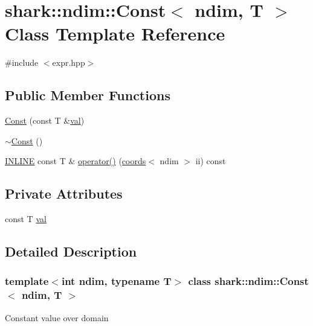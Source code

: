 \hypertarget{classshark_1_1ndim_1_1_const}{}\section{shark\+:\+:ndim\+:\+:Const$<$ ndim, T $>$ Class Template Reference}
\label{classshark_1_1ndim_1_1_const}


{\ttfamily \#include $<$expr.\+hpp$>$}

\subsection*{Public Member Functions}
\begin{DoxyCompactItemize}
\item 
\hyperlink{classshark_1_1ndim_1_1_const_a7045f6e927528a3abf82182f0c894be2}{Const} (const T \&\hyperlink{classshark_1_1ndim_1_1_const_aa7b1fd3a202063f3c8d08d75a890e4b0}{val})
\item 
\hyperlink{classshark_1_1ndim_1_1_const_a458fd0ff9671ebb6bba2e54247753126}{$\sim$\+Const} ()
\item 
\hyperlink{common_8hpp_a2eb6f9e0395b47b8d5e3eeae4fe0c116}{I\+N\+L\+I\+NE} const T \& \hyperlink{classshark_1_1ndim_1_1_const_aee20b9c9f89839ee80bcb42bab83281e}{operator()} (\hyperlink{structshark_1_1ndim_1_1coords}{coords}$<$ ndim $>$ ii) const
\end{DoxyCompactItemize}
\subsection*{Private Attributes}
\begin{DoxyCompactItemize}
\item 
const T \hyperlink{classshark_1_1ndim_1_1_const_aa7b1fd3a202063f3c8d08d75a890e4b0}{val}
\end{DoxyCompactItemize}


\subsection{Detailed Description}
\subsubsection*{template$<$int ndim, typename T$>$\newline
class shark\+::ndim\+::\+Const$<$ ndim, T $>$}

Constant value over domain 

